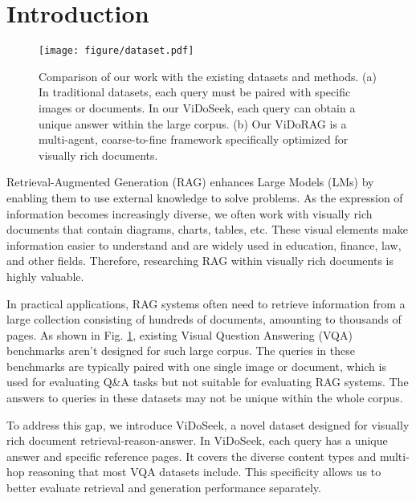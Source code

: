 \section{Introduction}

\begin{figure}[!t]
    \centering 
    \texttt{[image: figure/dataset.pdf]}
    \caption{
    Comparison of our work with the existing datasets and methods.
    (a) In traditional datasets, each query must be paired with specific images or documents. In our ViDoSeek, each query can obtain a unique answer within the large corpus.
    (b) Our ViDoRAG is a multi-agent, coarse-to-fine framework specifically optimized for visually rich documents.
    }
    \label{fig:compare_data_rag}
\end{figure}


Retrieval-Augmented Generation (RAG) enhances Large Models (LMs) by enabling them to use external knowledge to solve problems. As the expression of information becomes increasingly diverse, we often work with visually rich documents that contain diagrams, charts, tables, etc. These visual elements make information easier to understand and are widely used in education, finance, law, and other fields. Therefore, researching RAG within visually rich documents is highly valuable.

In practical applications, RAG systems often need to retrieve information from a large collection consisting of hundreds of documents, amounting to thousands of pages. As shown in Fig. \ref{fig:compare_data_rag}, existing Visual Question Answering (VQA) benchmarks aren't designed for such large corpus. The queries in these benchmarks are typically paired with one single image\cite{methani2020plotqa,masry2022chartqa,li2024multimodal,mathew2022infographicvqa} or document\cite{ma2024mmlongbenchdocbenchmarkinglongcontextdocument}, which is used for evaluating Q\&A tasks but not suitable for evaluating RAG systems. The answers to queries in these datasets may not be unique within the whole corpus.

To address this gap, we introduce ViDoSeek, a novel dataset designed for visually rich document retrieval-reason-answer. In ViDoSeek, each query has a unique answer and specific reference pages. It covers the diverse content types and multi-hop reasoning that most VQA datasets include.  This specificity allows us to better evaluate retrieval and generation performance separately. 

